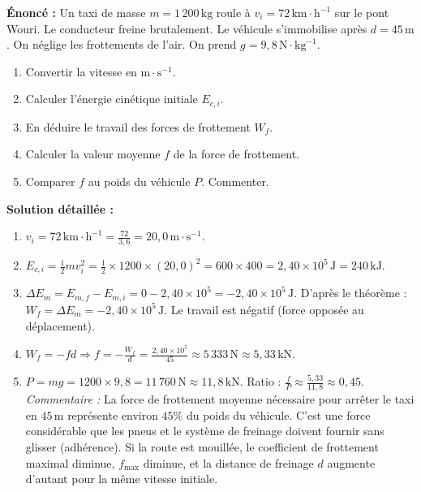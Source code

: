 \documentclass[11pt]{article}
\begin{document}
\begin{exoresolu}
\textbf{Énoncé :} Un taxi de masse $m = 1\,200\,\text{kg}$ roule à $v_i = 72\,\text{km}\!\cdot\!\text{h}^{-1}$ sur le pont Wouri. Le conducteur freine brutalement. Le véhicule s'immobilise après $d = 45\,\text{m}$. On néglige les frottements de l'air. On prend $g = 9,8\,\text{N}\!\cdot\!\text{kg}^{-1}$.
\begin{enumerate}
    \item Convertir la vitesse en $\text{m}\!\cdot\!\text{s}^{-1}$.
    \item Calculer l'énergie cinétique initiale $E_{c,i}$.
    \item En déduire le travail des forces de frottement $W_f$.
    \item Calculer la valeur moyenne $f$ de la force de frottement.
    \item Comparer $f$ au poids du véhicule $P$. Commenter.
\end{enumerate}
\tcblower
\textbf{Solution détaillée :}
\begin{enumerate}
    \item $v_i = 72\,\text{km}\!\cdot\!\text{h}^{-1} = \frac{72}{3,6} = 20,0\,\text{m}\!\cdot\!\text{s}^{-1}$.
    \item $E_{c,i} = \frac{1}{2} m v_i^2 = \frac{1}{2} \times 1200 \times (20,0)^2 = 600 \times 400 = 2,40 \times 10^5\,\text{J} = 240\,\text{kJ}$.
    \item $\Delta E_m = E_{m,f} - E_{m,i} = 0 - 2,40 \times 10^5 = -2,40 \times 10^5\,\text{J}$.
        D'après le théorème : $W_f = \Delta E_m = \boxed{-2,40 \times 10^5\,\text{J}}$. Le travail est négatif (force opposée au déplacement).
    \item $W_f = -f d \Rightarrow f = -\frac{W_f}{d} = \frac{2,40 \times 10^5}{45} \approx 5\,333\,\text{N} \approx \boxed{5,33\,\text{kN}}$.
    \item $P = mg = 1200 \times 9,8 = 11\,760\,\text{N} \approx 11,8\,\text{kN}$.
        Ratio : $\frac{f}{P} \approx \frac{5,33}{11,8} \approx 0,45$.
        \emph{Commentaire :} La force de frottement moyenne nécessaire pour arrêter le taxi en $45\,\text{m}$ représente environ $45\%$ du poids du véhicule. C'est une force considérable que les pneus et le système de freinage doivent fournir sans glisser (adhérence). Si la route est mouillée, le coefficient de frottement maximal diminue, $f_{\max}$ diminue, et la distance de freinage $d$ augmente d'autant pour la même vitesse initiale.
\end{enumerate}
\end{exoresolu}
\end{document}
